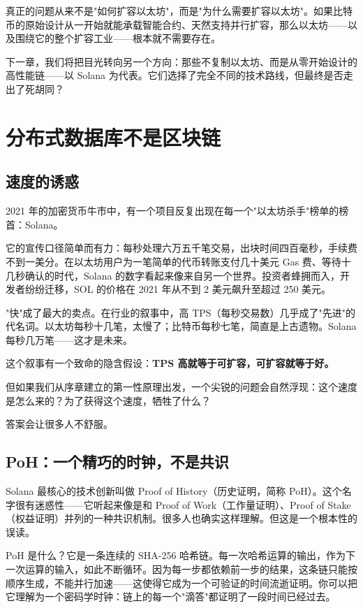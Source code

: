 \documentclass[a4paper,12pt,openany]{ctexbook}
\begin{document}
真正的问题从来不是"如何扩容以太坊"，而是"为什么需要扩容以太坊"。如果比特币的原始设计从一开始就能承载智能合约、天然支持并行扩容，那么以太坊——以及围绕它的整个扩容工业——根本就不需要存在。

下一章，我们将把目光转向另一个方向：那些不复制以太坊、而是从零开始设计的高性能链——以 Solana 为代表。它们选择了完全不同的技术路线，但最终是否走出了死胡同？



\chapter{分布式数据库不是区块链}



\section*{速度的诱惑}


2021 年的加密货币牛市中，有一个项目反复出现在每一个"以太坊杀手"榜单的榜首：Solana。

它的宣传口径简单而有力：每秒处理六万五千笔交易，出块时间四百毫秒，手续费不到一美分。在以太坊用户为一笔简单的代币转账支付几十美元 Gas 费、等待十几秒确认的时代，Solana 的数字看起来像来自另一个世界。投资者蜂拥而入，开发者纷纷迁移，SOL 的价格在 2021 年从不到 2 美元飙升至超过 250 美元。

"快"成了最大的卖点。在行业的叙事中，高 TPS（每秒交易数）几乎成了"先进"的代名词。以太坊每秒十几笔，太慢了；比特币每秒七笔，简直是上古遗物。Solana 每秒几万笔——这才是未来。

这个叙事有一个致命的隐含假设：\textbf{TPS 高就等于可扩容，可扩容就等于好。}

但如果我们从序章建立的第一性原理出发，一个尖锐的问题会自然浮现：这个速度是怎么来的？为了获得这个速度，牺牲了什么？

答案会让很多人不舒服。


\section*{PoH：一个精巧的时钟，不是共识}


Solana 最核心的技术创新叫做 Proof of History（历史证明，简称 PoH）。这个名字很有迷惑性——它听起来像是和 Proof of Work（工作量证明）、Proof of Stake（权益证明）并列的一种共识机制。很多人也确实这样理解。但这是一个根本性的误读。

PoH 是什么？它是一条连续的 SHA-256 哈希链。每一次哈希运算的输出，作为下一次运算的输入，如此不断循环。因为每一步都依赖前一步的结果，这条链只能按顺序生成，不能并行加速——这使得它成为一个可验证的时间流逝证明。你可以把它理解为一个密码学时钟：链上的每一个"滴答"都证明了一段时间已经过去。
\end{document}

